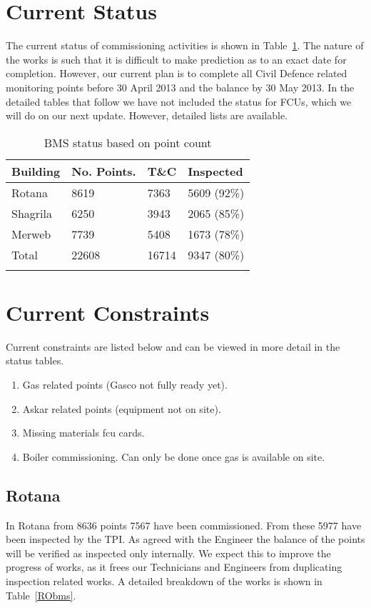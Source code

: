 \section{Current Status}

The current status of commissioning activities is shown in
Table~\ref{tbl:bmsstatus}. The nature of the works is such
that it is difficult to make prediction as to an exact date
for completion. However, our current plan is to complete all Civil Defence related monitoring points before 30 April 2013 and the balance by 30 May 2013. In the detailed tables that follow we have not included the status for FCUs, which we will do on our next update. However, detailed lists are available.


\begin{table}[htbp]
\begin{tabular}{llll}
\toprule
Building      &No. Points. &T\&C     &Inspected\\
\midrule
Rotana       & 8619        &7363      & 5609 (92\%) \\
Shagrila     & 6250        &3943      & 2065 (85\%) \\
Merweb     & 7739        &5408       & 1673 (78\%) \\
\midrule
Total          &22608       &16714     &9347  (80\%) \\
\bottomrule 
\caption{BMS status based on point count}
\label{tbl:bmsstatus}
\end{tabular}
\end{table}

\section{Current Constraints} 

Current constraints are listed below and can be viewed in more detail
in the status tables.

\begin{enumerate}
\item Gas related points (Gasco not fully ready yet).
\item Askar related points (equipment not on site).
\item Missing materials fcu cards.
\item Boiler commissioning. Can only be done once gas is available on
      site.
\end{enumerate}

\subsection{Rotana}
In Rotana from 8636 points 7567 have been commissioned. From these 5977 have been inspected by the TPI. As agreed with the Engineer the balance of the points will be verified as inspected only internally. We expect this to improve the progress of works, as it frees our Technicians and Engineers from duplicating inspection related works. A detailed breakdown of the works is shown in Table~\ref{RObms}. 
\bigskip



